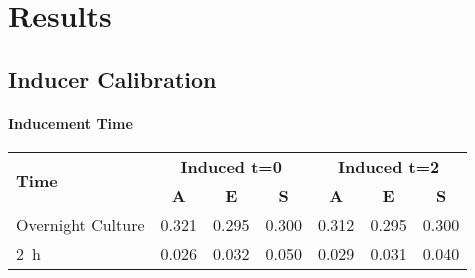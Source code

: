\documentclass[../main.tex]{subfiles}
\begin{document}
\section{Results}

\subsection{Inducer Calibration}

\paragraph{Inducement Time}

\begin{table}[h!]
\begin{center}
\begin{tabular}{l|c|c|c|c|c|c}
\multirow{2}{*}{\textbf{Time}} &	\multicolumn{3}{c|}{\textbf{Induced t=0}}  &	\multicolumn{3}{c}{\textbf{Induced t=2}}	\\
& \textbf{A} & \textbf{E} & \textbf{S} & \textbf{A} & \textbf{E} & \textbf{S} \\\hline
Overnight Culture & 0.321 & 0.295 & 0.300 & 0.312 & 0.295 & 0.300\\
\SI{2}{\hour} & 0.026 & 0.032 & 0.050 & 0.029 & 0.031 & 0.040
\end{tabular}
\end{center}
\end{table}
\end{document}

